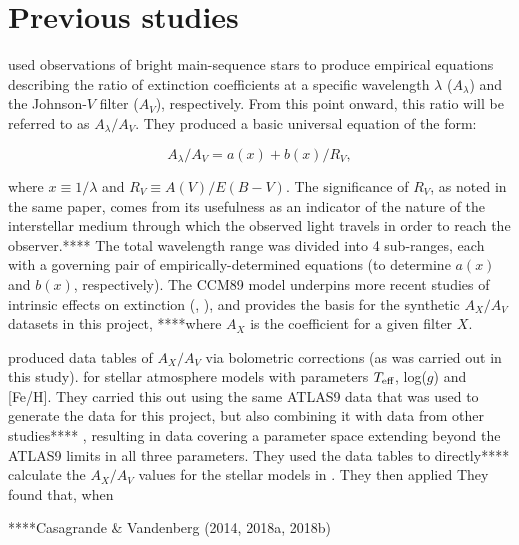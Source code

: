 \documentclass[12pt, a4paper]{report}
\begin{document}
\section{Previous studies}
\cite{1989ApJ...345..245C} used observations of bright main-sequence stars to produce empirical equations describing the ratio of extinction coefficients at a specific wavelength $\lambda$ ($A_{\lambda}$) and the Johnson-$V$ filter ($A_{V}$), respectively. From this point onward, this ratio will be referred to as $A_{\lambda}/A_{V}$. They produced a basic universal equation of the form:


\begin{equation}
A_{\lambda}/A_{V} = a(x) + b(x)/R_{V},
\label{CCM_general}
\end{equation}

where $x \equiv 1/\lambda$ and $R_{V} \equiv A(V)/E(B-V)$. The significance of $R_{V}$, as noted in the same paper, comes from its usefulness as an indicator of the nature of the interstellar medium through which the observed light travels in order to reach the observer.**** The total wavelength range was divided into 4 sub-ranges, each with a governing pair of empirically-determined equations (to determine $a(x)$ and $b(x)$, respectively). The CCM89 model underpins more recent studies of intrinsic effects on extinction (\cite{2008PASP..120..583G}, \cite{2018MNRAS.479L.102C}), and provides the basis for the synthetic $A_{X}/A_{V}$ datasets in this project, ****where $A_{X}$ is the coefficient for a given filter $X$.

\cite{2008PASP..120..583G} produced data tables of $A_{X}/A_{V}$ via bolometric corrections (as was carried out in this study). for stellar atmosphere models with parameters $T_{\textnormal{eff}}$, log($g$) and [Fe/H]. They carried this out using the same ATLAS9 data that was used to generate the data for this project, but also combining it with data from other studies**** \cite{2002A&A...391..195G}, resulting in data covering a parameter space extending beyond the ATLAS9 limits in all three parameters. They used the data tables to directly**** calculate the $A_{X}/A_{V}$ values for the stellar models in . They then applied They found that, when 

****Casagrande \& Vandenberg (2014, 2018a, 2018b)
\end{document}
